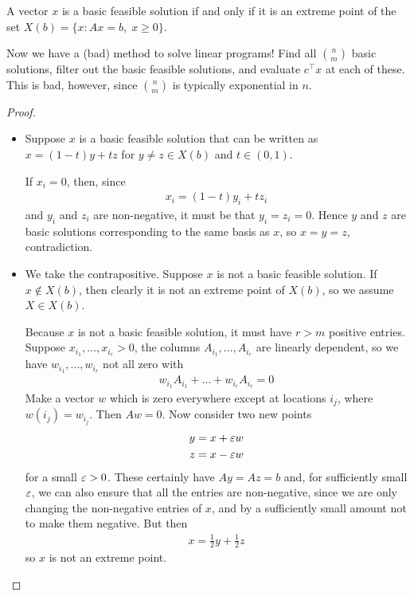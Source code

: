 \documentclass{../../template/note}
\begin{document}
    \begin{theorem}
        A vector $x$ is a basic feasible solution if and only if it is an extreme point of the set $X(b) = \{x: Ax = b, \; x \geq 0\}$.
    \end{theorem}
    
    \begin{remark*}
        Now we have a (bad) method to solve linear programs! Find all $\binom n m$ basic solutions, filter out the basic feasible solutions, and evaluate $c^\intercal x$ at each of these. This is bad, however, since $\binom n m$ is typically exponential in $n$.
    \end{remark*}

    \begin{proof}
        \begin{itemize}
            \item[$\implies$] Suppose $x$ is a basic feasible solution that can be written as $x = (1-t)y+tz$ for $y \neq z \in X(b)$ and $t \in (0, 1)$.

            If $x_i = 0$, then, since
            \begin{align*}
                x_i = (1-t)y_i + tz_i
            \end{align*}
            and $y_i$ and $z_i$ are non-negative, it must be that $y_i = z_i = 0$. Hence $y$ and $z$ are basic solutions corresponding to the same basis as $x$, so $x=y=z$, contradiction.
            \item[$\impliedby$] We take the contrapositive. Suppose $x$ is not a basic feasible solution. If $x \notin X(b)$, then clearly it is not an extreme point of $X(b)$, so we assume $X \in X(b)$.
            
            Because $x$ is not a basic feasible solution, it must have $r > m$ positive entries. Suppose $x_{i_1}, \dots, x_{i_r} > 0$, the columns $A_{i_1}, \dots, A_{i_r}$ are linearly dependent, so we have $w_{i_1}, \dots, w_{i_r}$ not all zero with
            \begin{align*}
                w_{i_1}A_{i_1} + \dots + w_{i_r}A_{i_r} = 0
            \end{align*}
            Make a vector $w$ which is zero everywhere except at locations $i_j$, where $w(i_j) = w_{i_j}$. Then $Aw = 0$. Now consider two new points
            \begin{align*}
                y &= x + \varepsilon w \\
                z &= x - \varepsilon w
            \end{align*}
            for a small $\varepsilon > 0$. These certainly have $Ay = Az = b$ and, for sufficiently small $\varepsilon$, we can also ensure that all the entries are non-negative, since we are only changing the non-negative entries of $x$, and by a sufficiently small amount not to make them negative. But then
            \begin{align*}
                x = \frac 1 2 y + \frac 1 2 z
            \end{align*}
            so $x$ is not an extreme point.            
        \end{itemize}
    \end{proof}
    
\end{document}
